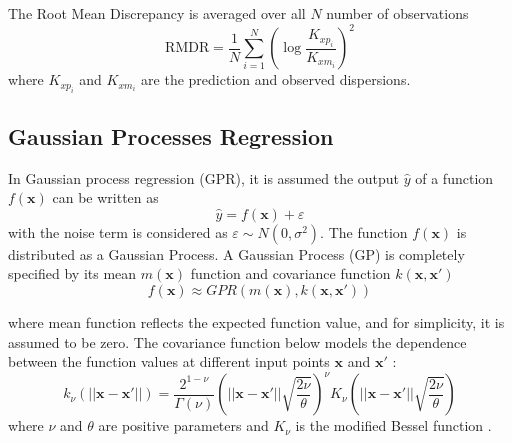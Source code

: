 \documentclass[a4paper,12pt, english]{article}
\newcommand{\x}{\mathbf{x}}
\begin{document}
The Root Mean Discrepancy is averaged over all $N$ number of observations 
\begin{equation}
 \label{eq:rmdr}
 \mbox{RMDR} = \frac{1}{N} \sum_{i=1}^{N} \left( \log{ \frac{K_{xp_i}}{K_{xm_i}} } \right)^2 
\end{equation} 
% 
where $K_{xp_i}$ and $K_{xm_i}$ are the prediction and observed dispersions.



\subsection{\label{sec:methods:gpr} Gaussian Processes Regression}


In Gaussian process regression (GPR), it is assumed the output $\hat{y}$ of a function  $f(\x)$ can be written as 
\[
 \hat{y} = f(\x) + \varepsilon
\]
with the noise term is considered as $\varepsilon \sim N(0, \sigma^2)$.
The function $f(\x)$ is distributed as a Gaussian Process.
A Gaussian Process (GP) is completely specified by its mean $m(\x)$ function and covariance function $k(\x, \mathbf{x'})$\cite{rasmussen:2006}
\[
 f(\x) \approx GPR (m(\x), k(\x, \mathbf{x'}))
\]

where mean function reflects the expected function value, and for simplicity, it is assumed to be zero.
%
The covariance function below  models the dependence between the function values at different input points  $\x$ and $\mathbf{x'}$ \cite{schulz:20181}:
\begin{equation}
 \label{eq:gpr-kernel-matern}
 k_{\nu}(||\x-\mathbf{x'}||) = \frac{2^{1-\nu}}{\Gamma(\nu)}  
 \left( ||\x-\mathbf{x'}|| \sqrt{\frac{2\nu}{\theta}} \right)^{\nu} 
 K_{\nu}\left( ||\x-\mathbf{x'}|| \sqrt{\frac{2\nu}{\theta} } \right)
\end{equation}
where $\nu$ and $\theta$ are positive parameters and $ K_{\nu}$ is the modified 
Bessel function \cite{kumar:2020101986}.
\end{document}
